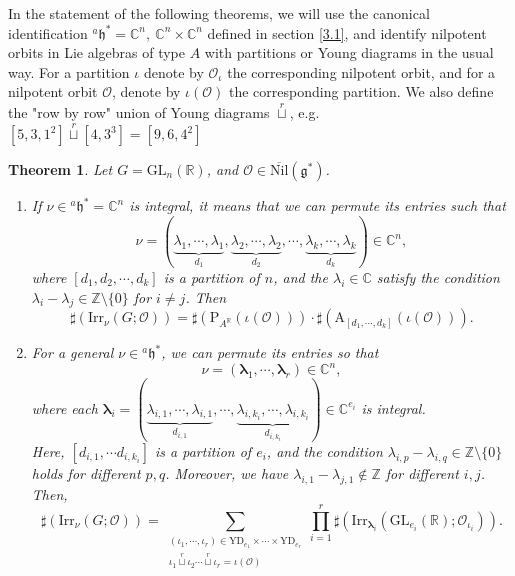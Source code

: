 \documentclass[12pt, a4paper]{amsart}
\numberwithin{equation}{section}
\newtheorem{thm}{Theorem}[section]
\newcommand{\blam}{{\boldsymbol{\lambda}}}
\newcommand{\BC}{{\mathbb {C}}}
\newcommand{\BR}{{\mathbb {R}}}
\newcommand{\BZ}{{\mathbb {Z}}}
\newcommand{\CO}{{\mathcal {O}}}
\newcommand{\RA}{{\mathrm {A}}}
\newcommand{\fg}{\mathfrak{g}}
\newcommand{\fh}{\mathfrak{h}}
\newcommand{\GL}{{\mathrm{GL}}}
\newcommand{\Irr}{{\mathrm{Irr}}}
\newcommand{\Nil}{{\mathrm{Nil}}}
\renewcommand{\bar}{\overline}
\begin{document}
In the statement of the following theorems, we will use the canonical identification $^{a}\fh^* = \BC^n, \ \BC^n \times \BC^n$ defined in section \ref{3.1}, and identify nilpotent orbits in Lie algebras of type $A$ with partitions or Young diagrams in the usual way. For a partition $\iota$ denote by $\CO_\iota$ the corresponding nilpotent orbit, and for a nilpotent orbit $\CO$, denote by $\iota(\CO)$ the corresponding partition. We also define the "row by row" union of Young diagrams $\mathop{\sqcup}\limits^r$, e.g. $[5,3,1^2] \mathop{\sqcup}\limits^r [4,3^3] = [9,6,4^2]$

\begin{thm}\label{R}
   Let $G = \GL_n(\BR)$, and $\CO \in \bar{\Nil}(\fg^*)$.
   \begin{enumerate}
        \item If $\nu \in {^{a}\fh^*} = \BC^n$ is integral, it means that we can permute its entries such that 
        \[
        \nu = (\underbrace{\lambda_1, \cdots, \lambda_1}_{d_1}, \underbrace{\lambda_2, \cdots, \lambda_2}_{d_2}, \cdots, \underbrace{\lambda_k, \cdots, \lambda_k}_{d_k}) \in \BC^n,
        \]
        where $[d_1, d_2, \cdots , d_k]$ is a partition of $n$, and the $\lambda_i \in \BC$ satisfy the condition $\lambda_i - \lambda_j \in \BZ \setminus \{0\}$ for $i \neq j$. Then
        \begin{equation}
            \sharp(\Irr_\nu(G;\CO)) = \sharp(\mathrm{P}_{A^{\BR}}(\iota(\CO)))\cdot \sharp(\RA_{[d_1,\cdots,d_k]}(\iota(\CO))).
        \end{equation}
        \item For a general $\nu \in {^{a}\fh}^*$, we can permute its entries so that 
        \[
        \nu = (\blam_1, \cdots, \blam_r) \in \BC^n,
        \]
        where each $\blam_i = (\underbrace{\lambda_{i,1}, \cdots, \lambda_{i,1}}_{d_{i,1}}, \cdots, \underbrace{\lambda_{i,k_i}, \cdots, \lambda_{i,k_i}}_{d_{i,k_i}}) \in \BC^{e_i}$ is integral.\\
        Here, $[d_{i,1}, \cdots d_{i,k_i} ]$ is a partition of $e_i$, and the condition $\lambda_{i,p} - \lambda_{i,q} \in \BZ \setminus \{0\}$ holds for different $p, q$. Moreover, we have $\lambda_{i,1} - \lambda_{j,1} \notin \BZ$ for different $i, j$. Then,
        \begin{equation}
            \sharp(\Irr_{\nu}(G;\CO)) = \sum_{\substack{(\iota_1,\cdots,\iota_r) \in \mathrm{YD}_{e_1} \times \cdots \times \mathrm{YD}_{e_r} \\ \iota_1 \mathop{\sqcup}\limits^r \iota_2 \cdots \mathop{\sqcup}\limits^r  \iota_r = \iota(\CO) }}\prod_{i=1}^{r}\sharp(\Irr_{\blam_i}(\GL_{e_i}(\BR);\CO_{\iota_i})).
        \end{equation}
    \end{enumerate}
\end{thm}
\end{document}

